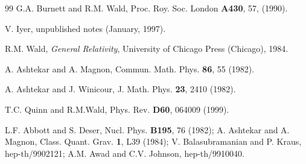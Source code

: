 \begin{thebibliography}{99}
 G.A. Burnett and R.M. Wald, Proc. Roy. Soc. London {\bf
A430}, 57, (1990).

 V. Iyer, unpublished notes (January, 1997).

 R.M. Wald, {\it General Relativity}, University of Chicago
Press (Chicago), 1984.

 A. Ashtekar and A. Magnon, Commun. Math. Phys. {\bf 86},
55 (1982).

 A. Ashtekar and J. Winicour, J. Math. Phys. {\bf 23},
2410 (1982).

 T.C. Quinn and R.M.Wald, Phys. Rev. {\bf D60}, 064009
(1999).

 L.F. Abbott and S. Deser, Nucl. Phys. {\bf B195}, 76
(1982); A. Ashtekar and A. Magnon, Class. Quant. Grav. {\bf 1}, L39
(1984); V. Balasubramanian and P. Kraus, hep-th/9902121; A.M. Awad and
C.V. Johnson, hep-th/9910040.

\end{thebibliography}




